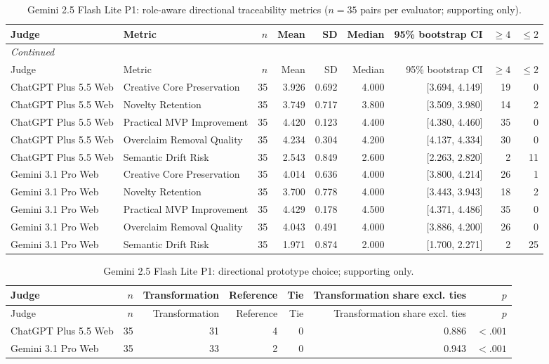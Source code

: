 \documentclass[10pt]{article}
\begin{document}
\begin{landscape}
\small
\begin{longtable}{llrrrrrrr}
\caption{Gemini 2.5 Flash Lite P1: role-aware directional traceability metrics ($n=35$ pairs per evaluator; supporting only).}\label{tab:s10-dir25p1}\\
\toprule
Judge & Metric & $n$ & Mean & SD & Median & 95\% bootstrap CI & $\geq4$ & $\leq2$ \\
\midrule\endfirsthead
\multicolumn{9}{l}{\small\itshape Continued}\\
\toprule Judge & Metric & $n$ & Mean & SD & Median & 95\% bootstrap CI & $\geq4$ & $\leq2$ \\ \midrule\endhead
\bottomrule\endfoot
ChatGPT Plus 5.5 Web & Creative Core Preservation & 35 & 3.926 & 0.692 & 4.000 & [3.694, 4.149] & 19 & 0 \\
ChatGPT Plus 5.5 Web & Novelty Retention & 35 & 3.749 & 0.717 & 3.800 & [3.509, 3.980] & 14 & 2 \\
ChatGPT Plus 5.5 Web & Practical MVP Improvement & 35 & 4.420 & 0.123 & 4.400 & [4.380, 4.460] & 35 & 0 \\
ChatGPT Plus 5.5 Web & Overclaim Removal Quality & 35 & 4.234 & 0.304 & 4.200 & [4.137, 4.334] & 30 & 0 \\
ChatGPT Plus 5.5 Web & Semantic Drift Risk & 35 & 2.543 & 0.849 & 2.600 & [2.263, 2.820] & 2 & 11 \\
Gemini 3.1 Pro Web & Creative Core Preservation & 35 & 4.014 & 0.636 & 4.000 & [3.800, 4.214] & 26 & 1 \\
Gemini 3.1 Pro Web & Novelty Retention & 35 & 3.700 & 0.778 & 4.000 & [3.443, 3.943] & 18 & 2 \\
Gemini 3.1 Pro Web & Practical MVP Improvement & 35 & 4.429 & 0.178 & 4.500 & [4.371, 4.486] & 35 & 0 \\
Gemini 3.1 Pro Web & Overclaim Removal Quality & 35 & 4.043 & 0.491 & 4.000 & [3.886, 4.200] & 26 & 0 \\
Gemini 3.1 Pro Web & Semantic Drift Risk & 35 & 1.971 & 0.874 & 2.000 & [1.700, 2.271] & 2 & 25 \\
\end{longtable}
\end{landscape}
\small
\begin{longtable}{lrrrrrr}
\caption{Gemini 2.5 Flash Lite P1: directional prototype choice; supporting only.}\label{tab:s11-pref25p1}\\
\toprule Judge & $n$ & Transformation & Reference & Tie & Transformation share excl. ties & $p$ \\ \midrule\endfirsthead
\toprule Judge & $n$ & Transformation & Reference & Tie & Transformation share excl. ties & $p$ \\ \midrule\endhead
\bottomrule\endfoot
ChatGPT Plus 5.5 Web & 35 & 31 & 4 & 0 & 0.886 & $<.001$ \\
Gemini 3.1 Pro Web & 35 & 33 & 2 & 0 & 0.943 & $<.001$ \\
\end{longtable}
\end{document}
